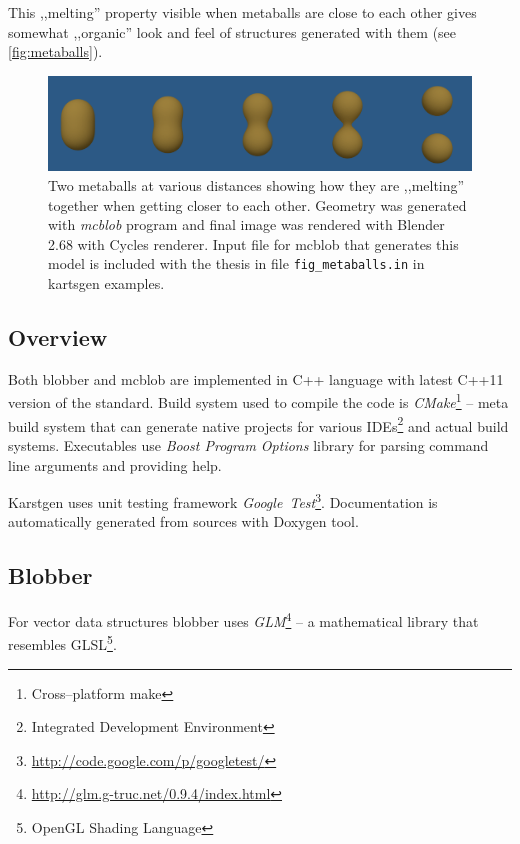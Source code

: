 This ,,melting'' property visible when metaballs are close to each other gives
somewhat ,,organic'' look and feel of structures generated with them
(see \autoref{fig:metaballs}).
\label{sub:metaballs}
\begin{figure}[htb]
  \begin{center}
    \includegraphics[width=\textwidth]{chapters/project/metaballs.png}
  \end{center}
  \caption{Two metaballs at various distances showing how they are ,,melting''
    together when getting closer to each other. Geometry was generated with
    \emph{mcblob} program and final image was rendered with Blender 2.68 with
    Cycles renderer. Input file for mcblob that generates this model is
    included with the thesis in file \texttt{fig\_metaballs.in} in kartsgen examples.
  }
  \label{fig:metaballs}
\end{figure}


\subsection{Overview}
Both blobber and mcblob are implemented in C++ language with latest C++11
version of the standard. Build system used to compile the code is \emph{CMake}\footnote{Cross--platform make}
-- meta build system that can generate native projects for various IDEs\footnote{Integrated Development Environment}
and actual build systems. Executables use \emph{Boost Program Options} library
for parsing command line arguments and providing help.

Karstgen uses unit testing framework \emph{Google~Test}\footnote{\url{http://code.google.com/p/googletest/}}.
Documentation is automatically generated from sources with Doxygen
tool.


\subsection{Blobber}

For vector data structures blobber uses \emph{GLM}\footnote{\url{http://glm.g-truc.net/0.9.4/index.html}}
-- a mathematical library that resembles GLSL\footnote{OpenGL Shading Language}.

